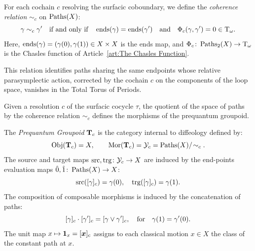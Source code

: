 \documentclass[11pt,reqno,letterpaper,twoside]{amsart}
\begin{document}
  \begin{article}
    \label{art:The Equivalence Relation}
    
    For each cochain $c$ resolving the surfacic coboundary,
    we define the \emph{coherence relation} $\sim_c$ on $\operatorname{Paths}(X)$:
    \[
      \gamma \sim_c \gamma'
      \quad\text{if and only if}\quad
      \operatorname{ends}(\gamma) = \operatorname{ends}(\gamma')
      \quad\text{and}\quad
      \Phi_c(\gamma, \gamma') = 0 \in \mathrm{T}_\omega.
      \]
    Here,
    $\operatorname{ends}(\gamma) = (\gamma(0), \gamma(1)) \in X \times X$ is the ends map,
    and $\Phi_c \colon \operatorname{Paths}_2(X) \to \mathrm{T}_\omega$ is the Chasles function of Article~\ref{art:The Chasles Function}.
    
    This relation identifies paths sharing the same endpoints whose relative parasymplectic action,
    corrected by the cochain $c$ on the components of the loop space,
    vanishes in the Total Torus of Periods.
  \end{article}
  
  \begin{article}
    \label{art:Definition of the Groupoids}
    
    Given a resolution $c$ of the surfacic cocycle $\tau$,
    the quotient of the space of paths by the coherence relation $\sim_c$ defines the morphisms of the prequantum groupoid.
    
    \begin{definition}
      The \emph{Prequantum Groupoid} $\mathbf{T}_c$ is the category internal to diffeology defined by:
      \[
        {\operatorname{Obj}}(\mathbf{T}_c) = X, \qquad {\operatorname{Mor}}(\mathbf{T}_c) = \mathcal{Y}_c = \operatorname{Paths}(X) / \!\sim_c.
        \]
      The source and target maps $\operatorname{src}, \operatorname{trg} \colon \mathcal{Y}_c \to X$ are induced by the end-points evaluation maps $\hat 0, \hat 1 \colon \operatorname{Paths}(X) \to X$:
      \[
        \operatorname{src}([\gamma]_c) = \gamma(0), \quad \operatorname{trg}([\gamma]_c) = \gamma(1).
        \]
      The composition of composable morphisms is induced by the concatenation of paths:
      \[
        [\gamma]_c \cdot [\gamma']_c = [\gamma \vee \gamma']_c,
        \quad\text{for}\quad \gamma(1) = \gamma'(0).
        \]
      The unit map $x \mapsto {\mathbf{1}}_x = [\boldsymbol{x}]_c$ assigns to each classical motion $x \in X$ the class of the constant path at $x$.
    \end{definition}
  \end{article}
  
\end{document}
